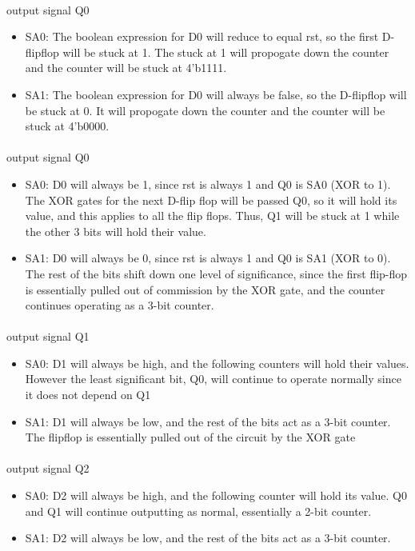 \documentclass{article}
\begin{document}
  	\paragraph{} output signal Q0
  	\begin{itemize}
  		\item SA0: The boolean expression for D0 will reduce to equal rst, so the first D-flipflop will be stuck at 1. The stuck at 1 will propogate down the counter and the counter will be stuck at 4'b1111.
  		\item SA1: The boolean expression for D0 will always be false, so the D-flipflop will be stuck at 0. It will propogate down the counter and the counter will be stuck at 4'b0000.
  	\end{itemize}

  	\paragraph{} output signal Q0
  	\begin{itemize}
  		\item SA0: D0 will always be 1, since rst is always 1 and Q0 is SA0 (XOR to 1). The XOR gates for the next D-flip flop will be passed Q0, so it will hold its value, and this applies to all the flip flops. Thus, Q1 will be stuck at 1 while the other 3 bits will hold their value.
  		\item SA1: D0 will always be 0, since rst is always 1 and Q0 is SA1 (XOR to 0). The rest of the bits shift down one level of significance, since the first flip-flop is essentially pulled out of commission by the XOR gate, and the counter continues operating as a 3-bit counter.
  	\end{itemize}

  	\paragraph{} output signal Q1
   	\begin{itemize}
  		\item SA0: D1 will always be high, and the following counters will hold their values. However the least significant bit, Q0, will continue to operate normally since it does not depend on Q1
  		\item SA1: D1 will always be low, and the rest of the bits act as a 3-bit counter. The flipflop is essentially pulled out of the circuit by the XOR gate
  	\end{itemize}

  	\paragraph{} output signal Q2
  	\begin{itemize}
  		\item SA0: D2 will always be high, and the following counter will hold its value. Q0 and Q1 will continue outputting as normal, essentially a 2-bit counter.
  		\item SA1: D2 will always be low, and the rest of the bits act as a 3-bit counter.
  	\end{itemize}
\end{document}
